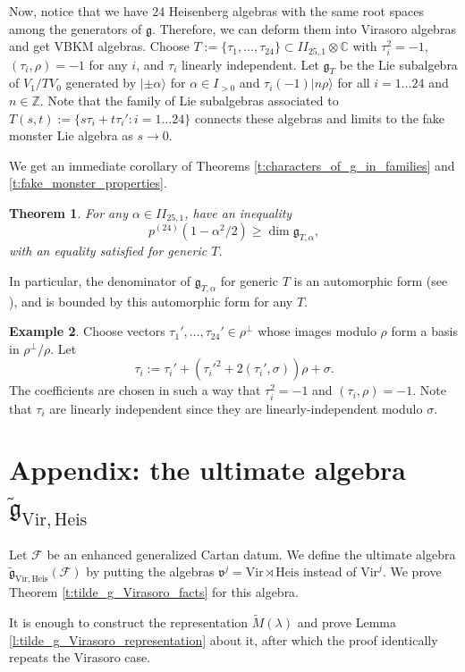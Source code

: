 \documentclass[11pt]{amsart}
\newcommand{\mc}{\mathcal}
\newcommand{\ket}[1]{|#1\rangle}
\renewcommand{\ge}{\geqslant}
\newcommand{\C}{\mathbb{C}}
\newcommand{\Z}{\mathbb{Z}}
\newcommand{\g}{\mathfrak{g}}
\newcommand{\Vir}{\mathrm{Vir}}
\newcommand{\Heis}{\mathrm{Heis}}
\numberwithin{equation}{section}
\theoremstyle{plain}
\newtheorem{theorem}{Theorem}[section]
\theoremstyle{definition}
\newtheorem{example}[theorem]{Example}
\begin{document}
Now, notice that we have $24$ Heisenberg algebras with the same root spaces among the generators of $\g$. Therefore, we can deform them into Virasoro algebras and get VBKM algebras. Choose $T:=\{\tau_1,\ldots,\tau_{24}\}\subset II_{25,1}\otimes\C$ with $\tau_i^2=-1$, $(\tau_i,\rho)=-1$ for any $i$, and $\tau_i$ linearly independent. Let $\g_T$ be the Lie subalgebra of $V_1/TV_0$ generated by $\ket{\pm\alpha}$ for $\alpha\in I_{>0}$ and $\tau_i(-1)\ket{n\rho}$ for all $i=1\ldots24$ and $n\in\Z$. Note that the family of Lie subalgebras associated to $T(s,t):=\{s\tau_i+t\tau_i':i=1\ldots24\}$ connects these algebras and limits to the fake monster Lie algebra as $s\to 0$.

We get an immediate corollary of Theorems \ref{t:characters_of_g_in_families} and \ref{t:fake_monster_properties}.
\begin{theorem}
    For any $\alpha\in II_{25,1}$,  have an inequality
    $$
    p^{(24)}(1-\alpha^2/2)\ge \dim\g_{T,\alpha},
    $$
    with an equality satisfied for generic $T$.
\end{theorem}
In particular, the denominator of $\g_{T,\alpha}$ for generic $T$ is an automorphic form (see \cite{Bor95}), and is bounded by this automorphic form for any $T$.

\begin{example}
    Choose vectors $\tau_1',\ldots,\tau_{24}'\in \rho^\perp$ whose images modulo $\rho$ form a basis in $\rho^\perp/\rho$. Let
    $$
    \tau_i:=\tau_i'+(\tau_i'^2+2(\tau_i',\sigma))\rho+\sigma.
    $$
    The coefficients are chosen in such a way that $\tau_i^2=-1$ and $(\tau_i,\rho)=-1$. Note that $\tau_i$ are linearly independent since they are linearly-independent modulo $\sigma$.
\end{example}



\section{Appendix: the ultimate algebra $\tilde{\g}_{\Vir,\Heis}$}
Let $\mc F$ be an enhanced generalized Cartan datum. We define the ultimate algebra $\tilde{\g}_{\Vir,\Heis}(\mc F)$ by putting the algebras $\mathfrak{v}^j=\Vir\rtimes \Heis$ instead of $\Vir^j$. We prove Theorem \ref{t:tilde_g_Virasoro_facts} for this algebra.

It is enough to construct the representation $\widetilde M(\lambda)$ and prove Lemma \ref{l:tilde_g_Virasoro_representation} about it, after which the proof identically repeats the Virasoro case.
\end{document}
